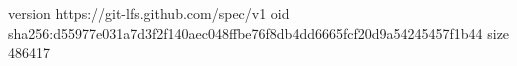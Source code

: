version https://git-lfs.github.com/spec/v1
oid sha256:d55977e031a7d3f2f140aec048ffbe76f8db4dd6665fcf20d9a54245457f1b44
size 486417

